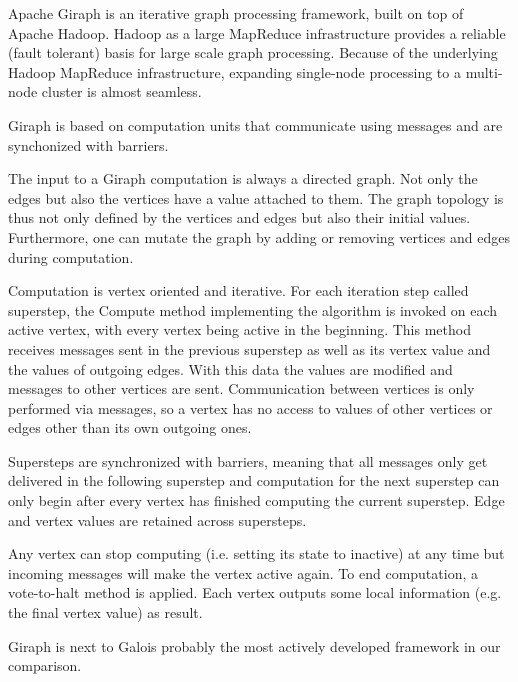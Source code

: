 

Apache Giraph is an iterative graph processing framework, built on top of Apache Hadoop\cite{Giraph}. Hadoop as a large MapReduce infrastructure provides a reliable (fault tolerant) basis for large scale graph processing.
Because of the underlying Hadoop MapReduce infrastructure, expanding single-node processing to a multi-node cluster is almost seamless.

Giraph is based on computation units that communicate using messages and are synchonized with barriers.

The input to a Giraph computation is always a directed graph. Not only the edges but also the vertices have a value attached to them. The graph topology is thus not only defined by the vertices and edges but also their initial values.
Furthermore, one can mutate the graph by adding or removing vertices and edges during computation.

Computation is vertex oriented and iterative.
For each iteration step called superstep, the Compute method implementing the algorithm is invoked on each active vertex, with every vertex being active in the beginning.
This method receives messages sent in the previous superstep as well as its vertex value and the values of outgoing edges.
With this data the values are modified and messages to other vertices are sent.
Communication between vertices is only performed via messages, so a vertex has no access to values of other vertices or edges other than its own outgoing ones.

Supersteps are synchronized with barriers, meaning that all messages only get delivered in the following superstep and computation for the next superstep can only begin after every vertex has finished computing the current superstep.
Edge and vertex values are retained across supersteps.

Any vertex can stop computing (i.e. setting its state to inactive) at any time but incoming messages will make the vertex active again.
To end computation, a vote-to-halt method is applied. Each vertex outputs some local information (e.g. the final vertex value) as result.

Giraph is next to Galois probably the most actively developed framework in our comparison.
